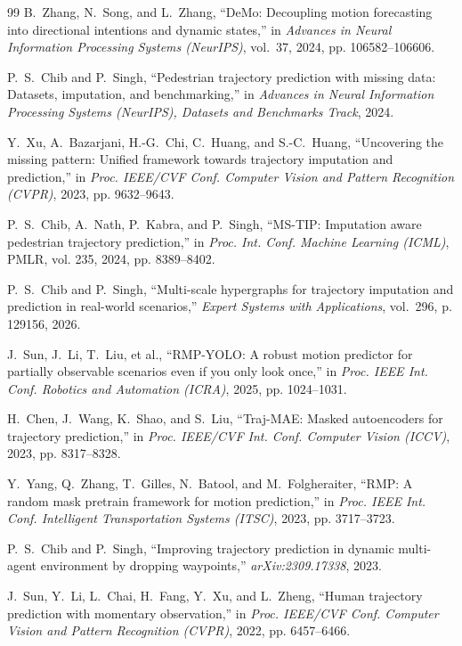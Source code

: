 \begin{thebibliography}{99}
B.~Zhang, N.~Song, and L.~Zhang, ``DeMo: Decoupling motion forecasting into directional intentions and dynamic states,'' in \emph{Advances in Neural Information Processing Systems (NeurIPS)}, vol.~37, 2024, pp. 106582--106606.

P.~S.~Chib and P.~Singh, ``Pedestrian trajectory prediction with missing data: Datasets, imputation, and benchmarking,'' in \emph{Advances in Neural Information Processing Systems (NeurIPS), Datasets and Benchmarks Track}, 2024.

Y.~Xu, A.~Bazarjani, H.-G.~Chi, C.~Huang, and S.-C.~Huang, ``Uncovering the missing pattern: Unified framework towards trajectory imputation and prediction,'' in \emph{Proc. IEEE/CVF Conf. Computer Vision and Pattern Recognition (CVPR)}, 2023, pp. 9632--9643.

P.~S.~Chib, A.~Nath, P.~Kabra, and P.~Singh, ``MS-TIP: Imputation aware pedestrian trajectory prediction,'' in \emph{Proc. Int. Conf. Machine Learning (ICML)}, PMLR, vol. 235, 2024, pp. 8389--8402.

P.~S.~Chib and P.~Singh, ``Multi-scale hypergraphs for trajectory imputation and prediction in real-world scenarios,'' \emph{Expert Systems with Applications}, vol.~296, p. 129156, 2026.

J.~Sun, J.~Li, T.~Liu, et al., ``RMP-YOLO: A robust motion predictor for partially observable scenarios even if you only look once,'' in \emph{Proc. IEEE Int. Conf. Robotics and Automation (ICRA)}, 2025, pp. 1024--1031.

H.~Chen, J.~Wang, K.~Shao, and S.~Liu, ``Traj-MAE: Masked autoencoders for trajectory prediction,'' in \emph{Proc. IEEE/CVF Int. Conf. Computer Vision (ICCV)}, 2023, pp. 8317--8328.

Y.~Yang, Q.~Zhang, T.~Gilles, N.~Batool, and M.~Folgheraiter, ``RMP: A random mask pretrain framework for motion prediction,'' in \emph{Proc. IEEE Int. Conf. Intelligent Transportation Systems (ITSC)}, 2023, pp. 3717--3723.

P.~S.~Chib and P.~Singh, ``Improving trajectory prediction in dynamic multi-agent environment by dropping waypoints,'' \emph{arXiv:2309.17338}, 2023.

J.~Sun, Y.~Li, L.~Chai, H.~Fang, Y.~Xu, and L.~Zheng, ``Human trajectory prediction with momentary observation,'' in \emph{Proc. IEEE/CVF Conf. Computer Vision and Pattern Recognition (CVPR)}, 2022, pp. 6457--6466.


\end{thebibliography}
